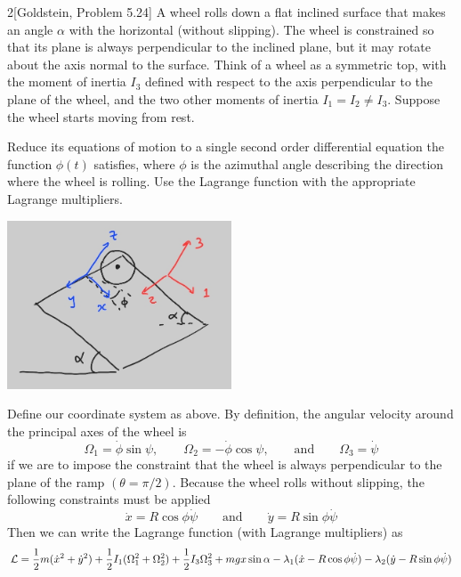 \documentclass[12pt]{article}
\begin{document}
\begin{problem}{2}[Goldstein, Problem 5.24]
A wheel rolls down a flat inclined surface that makes an angle $\alpha$ with the
horizontal (without slipping). The wheel is constrained so that its plane is
always perpendicular to the inclined plane, but it may rotate about the axis
normal to the surface. Think of a wheel as a symmetric top, with the moment of
inertia $I_3$ defined with respect to the axis perpendicular to the plane of the
wheel, and the two other moments of inertia $I_1=I_2\neq I_3$. Suppose the wheel
starts moving from rest.

Reduce its equations of motion to a single second order differential equation
the function $\phi(t)$ satisfies, where $\phi$ is the azimuthal angle describing
the direction where the wheel is rolling. Use the Lagrange function with the
appropriate Lagrange multipliers.
\begin{solution}
\begin{center}
    \includegraphics[width=0.5\textwidth]{hw7_p2.jpg} 
\end{center} 
Define our coordinate system as above. By definition, the angular velocity
around the principal axes of the wheel is
\begin{equation}
    \Omega_1=\dot\phi\sin\psi,\qquad
    \Omega_2=-\dot\phi\cos\psi,\qquad\text{and}\qquad
    \Omega_3=\dot\psi
\end{equation}
if we are to impose the constraint that the wheel is always perpendicular to the
plane of the ramp $(\theta=\pi /2)$. Because the wheel rolls without slipping,
the following constraints must be applied
\begin{equation}\label{p2:xydot}
    \dot{x}=R\cos\phi\dot\psi\qquad\text{and}\qquad
    \dot{y}=R\sin\phi\dot\psi
\end{equation}
Then we can write the Lagrange function (with Lagrange multipliers) as
\begin{align}
    \LL&=\frac12m(\dot{x}^2+\dot{y}^2)+\frac12I_1(\Omega_1^2+\Omega_2^2)+\frac12I_3\Omega_3^2+mgx\sin\alpha-\lambda_1(\dot{x}-R\cos\phi\dot\psi)-\lambda_2(\dot{y}-R\sin\phi\dot\psi)\notag\\

\end{align}
\end{solution}
\end{problem}
\end{document}
